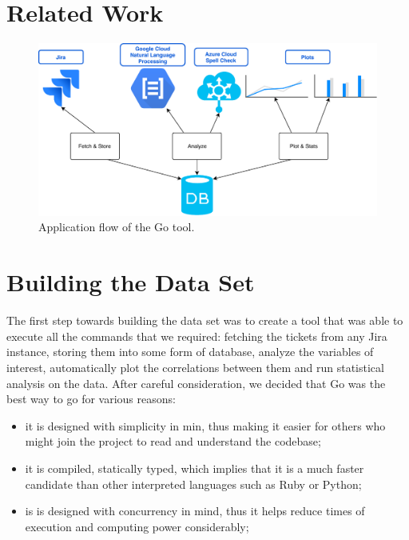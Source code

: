 \documentclass{mpaper}
\begin{document}
\section{Related Work}\label{related_work}

\begin{figure}
\begin{center}
\includegraphics[width=\textwidth]{images/flow.pdf}
\end{center}
\caption{\label{fig-eg}Application flow of the Go tool.}
\end{figure}


\section{Building the Data Set}\label{building}
The first step towards building the data set was to create a tool that was able to execute all the commands that we required:
fetching the tickets from any Jira instance, storing them into some form of database, analyze the variables of interest, 
automatically plot the correlations between them and run statistical analysis on the data. After careful consideration, 
we decided that Go was the best way to go for various reasons:
  \begin{itemize}
    \item it is designed with simplicity in min, thus making it easier for others who might join the project to read 
    and understand the codebase;
    \item it is compiled, statically typed, which implies that it is a much faster candidate than other interpreted languages
    such as Ruby or Python;
    \item is is designed with concurrency in mind, thus it helps reduce times of execution and computing power considerably;
  \end{itemize}
\end{document}

